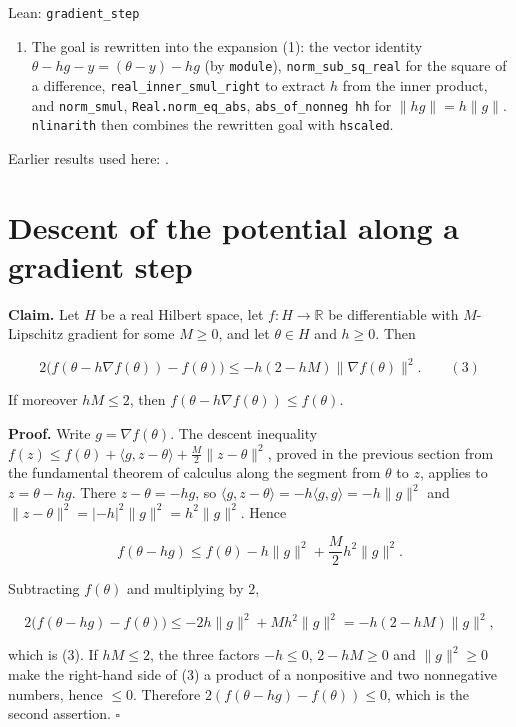 \documentclass[11pt,a4paper]{article}
\begin{document}
\begin{leanbox}{Lean: \texttt{gradient\_\allowbreak{}step}}
\begin{enumerate}
\item The goal is rewritten into the expansion (1): the vector identity \(\theta-hg-y=(\theta-y)-hg\) (by \texttt{module}), \texttt{norm\_\allowbreak{}sub\_\allowbreak{}sq\_\allowbreak{}real} for the square of a difference, \texttt{real\_\allowbreak{}inner\_\allowbreak{}smul\_\allowbreak{}right} to extract \(h\) from the inner product, and \texttt{norm\_\allowbreak{}smul}, \texttt{Real.\allowbreak{}norm\_\allowbreak{}eq\_\allowbreak{}abs}, \texttt{abs\_\allowbreak{}of\_\allowbreak{}nonneg hh} for \(\|hg\|=h\|g\|\). \texttt{nlinarith} then combines the rewritten goal with \texttt{hscaled}.

\end{enumerate}
\end{leanbox}


Earlier results used here: \cite[Section~3.2.2]{LangevinLean2026ULASC}.

\section{\texorpdfstring{Descent of the potential along a gradient step}{Descent of the potential along a gradient step}}


\textbf{Claim.} Let \(H\) be a real Hilbert space, let \(f:H\to\mathbb R\) be differentiable with \(M\)-Lipschitz gradient for some \(M\ge0\), and let \(\theta\in H\) and \(h\ge0\). Then


\[2\bigl(f(\theta-h\nabla f(\theta))-f(\theta)\bigr)\le-h(2-hM)\|\nabla f(\theta)\|^2.\qquad(3)\]


If moreover \(hM\le2\), then \(f(\theta-h\nabla f(\theta))\le f(\theta)\).




\textbf{Proof.} Write \(g=\nabla f(\theta)\). The descent inequality \(f(z)\le f(\theta)+\langle g,z-\theta\rangle+\frac M2\|z-\theta\|^2\), proved in the previous section from the fundamental theorem of calculus along the segment from \(\theta\) to \(z\), applies to \(z=\theta-hg\). There \(z-\theta=-hg\), so \(\langle g,z-\theta\rangle=-h\langle g,g\rangle=-h\|g\|^2\) and \(\|z-\theta\|^2=|-h|^2\|g\|^2=h^2\|g\|^2\). Hence


\[f(\theta-hg)\le f(\theta)-h\|g\|^2+\frac M2h^2\|g\|^2.\]


Subtracting \(f(\theta)\) and multiplying by \(2\),


\[2\bigl(f(\theta-hg)-f(\theta)\bigr)\le-2h\|g\|^2+Mh^2\|g\|^2=-h(2-hM)\|g\|^2,\]


which is (3). If \(hM\le2\), the three factors \(-h\le0\), \(2-hM\ge0\) and \(\|g\|^2\ge0\) make the right-hand side of (3) a product of a nonpositive and two nonnegative numbers, hence \(\le0\). Therefore \(2(f(\theta-hg)-f(\theta))\le0\), which is the second assertion. \(\square\)
\end{document}
